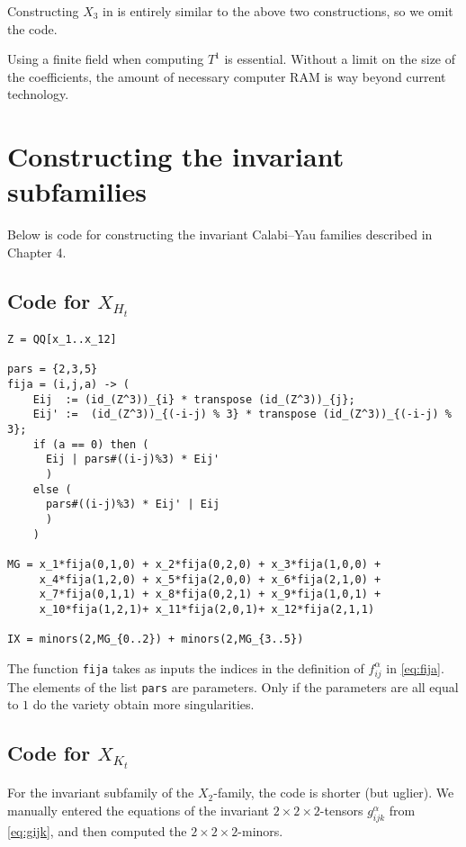 Constructing $X_3$ in \MM is entirely similar to the above two constructions, so we omit the code.

\begin{remark}
Using a finite field when computing $T^1$ is essential. Without a limit on the size of the coefficients, the amount of necessary computer RAM is way beyond current technology.
\end{remark}

\section{Constructing the invariant subfamilies}

Below is \MM code for constructing the invariant Calabi--Yau families described in Chapter 4.

\subsection{Code for $X_{H_t}$}
\begin{minipage}{\linewidth}
\begin{lstlisting}[caption=Code for $X_{H_t}$, language=Macaulay2]
Z = QQ[x_1..x_12]

pars = {2,3,5}
fija = (i,j,a) -> (
    Eij  := (id_(Z^3))_{i} * transpose (id_(Z^3))_{j};
    Eij' :=  (id_(Z^3))_{(-i-j) % 3} * transpose (id_(Z^3))_{(-i-j) % 3};
    if (a == 0) then (
      Eij | pars#((i-j)%3) * Eij'
      )
    else (
      pars#((i-j)%3) * Eij' | Eij
      )
    )

MG = x_1*fija(0,1,0) + x_2*fija(0,2,0) + x_3*fija(1,0,0) + 
     x_4*fija(1,2,0) + x_5*fija(2,0,0) + x_6*fija(2,1,0) +
     x_7*fija(0,1,1) + x_8*fija(0,2,1) + x_9*fija(1,0,1) +
     x_10*fija(1,2,1)+ x_11*fija(2,0,1)+ x_12*fija(2,1,1)

IX = minors(2,MG_{0..2}) + minors(2,MG_{3..5})
\end{lstlisting}
\end{minipage}

The function \texttt{fija} takes as inputs the indices in the definition of $f_{ij}^\alpha$ in \cref{eq:fija}. The elements of the list \texttt{pars} are parameters. Only if the parameters are all equal to $1$ do the variety obtain more singularities.

\subsection{Code for $X_{K_t}$}
{}
For the invariant subfamily of the $X_2$-family, the code is shorter (but uglier). We manually entered the equations of the invariant $2 \times 2 \times 2$-tensors $g_{ijk}^\alpha$ from \cref{eq:gijk}, and then computed the $2 \times 2 \times 2$-minors.

